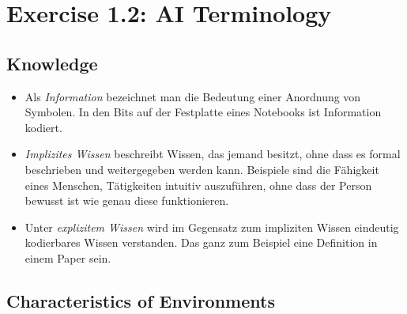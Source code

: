 \documentclass[a4paper]{scrartcl}
\begin{document}
\section*{Exercise 1.2: AI Terminology}

\subsection*{Knowledge}
\begin{itemize}
    \item
        Als \emph{Information} bezeichnet man die Bedeutung einer Anordnung von
        Symbolen. In den Bits auf der Festplatte eines Notebooks ist
        Information kodiert.

    \item
        \emph{Implizites Wissen} beschreibt Wissen, das jemand besitzt, ohne
        dass es formal beschrieben und weitergegeben werden kann. Beispiele
        sind die Fähigkeit eines Menschen, Tätigkeiten intuitiv auszuführen,
        ohne dass der Person bewusst ist wie genau diese funktionieren.

    \item
        Unter \emph{explizitem Wissen} wird im Gegensatz zum impliziten Wissen
        eindeutig kodierbares Wissen verstanden.  Das ganz zum Beispiel eine
        Definition in einem Paper sein.

\end{itemize}

\subsection*{Characteristics of Environments}
\end{document}
